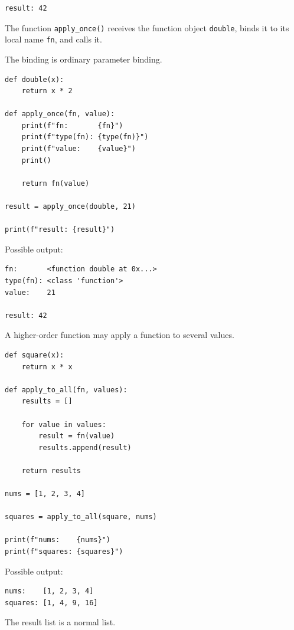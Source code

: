 \begin{verbatim}
result: 42
\end{verbatim}

The function \texttt{apply\_once()} receives the function object \texttt{double}, binds it to its local name \texttt{fn}, and calls it.

The binding is ordinary parameter binding.

\begin{verbatim}
def double(x):
    return x * 2

def apply_once(fn, value):
    print(f"fn:       {fn}")
    print(f"type(fn): {type(fn)}")
    print(f"value:    {value}")
    print()

    return fn(value)

result = apply_once(double, 21)

print(f"result: {result}")
\end{verbatim}

Possible output:

\begin{verbatim}
fn:       <function double at 0x...>
type(fn): <class 'function'>
value:    21

result: 42
\end{verbatim}

A higher-order function may apply a function to several values.

\begin{verbatim}
def square(x):
    return x * x

def apply_to_all(fn, values):
    results = []

    for value in values:
        result = fn(value)
        results.append(result)

    return results

nums = [1, 2, 3, 4]

squares = apply_to_all(square, nums)

print(f"nums:    {nums}")
print(f"squares: {squares}")
\end{verbatim}

Possible output:

\begin{verbatim}
nums:    [1, 2, 3, 4]
squares: [1, 4, 9, 16]
\end{verbatim}

The result list is a normal list.

